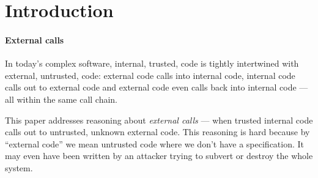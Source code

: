 
\section{Introduction}
\label{s:intro}

\paragraph{External calls}

In today's complex software, internal, trusted, code  is tightly intertwined  with external, untrusted, code: external code
calls into internal code, internal code calls
out to external code  and external code  even calls back  into internal code --- all within the same call chain.


This paper addresses reasoning about \emph{external calls} --- when
trusted internal code calls out to untrusted, unknown external code.
This reasoning is hard because by ``external code'' we mean untrusted
code where we don't have a specification.
It may even have been written by an attacker trying to subvert or destroy the whole system.  
%
 

\vspace*{1mm}

